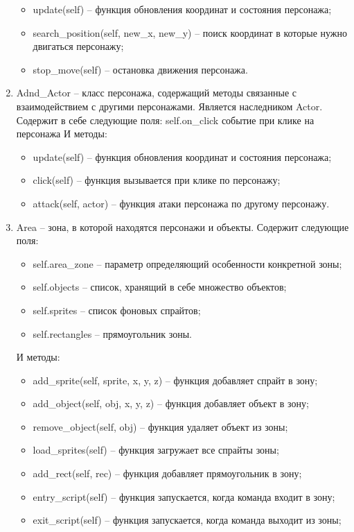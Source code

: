 \begin{enumerate}
\begin{itemize}
			\item update(self) -- функция обновления координат и состояния персонажа;
			\item search\_position(self, new\_x, new\_y) -- поиск координат в которые нужно двигаться персонажу;
			\item stop\_move(self) -- остановка движения персонажа.
		\end{itemize}
	\item Adnd\_Actor -- класс персонажа, содержащий методы связанные с взаимодействием с другими персонажами. Является наследником Actor. Содержит в себе следующие поля:
		self.on\_click событие при клике на персонажа
		И методы:
		\begin{itemize}
			\item update(self) -- функция обновления координат и состояния персонажа;
			\item click(self) -- функция вызывается при клике по персонажу;
			\item attack(self, actor) --  функция атаки персонажа по другому персонажу.
		\end{itemize}
	\item Area -- зона, в которой находятся персонажи и объекты. Содержит следующие поля:
		\begin{itemize}
			\item self.area\_zone -- параметр определяющий особенности конкретной зоны;
			\item self.objects -- список, хранящий в себе множество объектов;
			\item self.sprites -- список фоновых спрайтов;
			\item self.rectangles -- прямоугольник зоны.
		\end{itemize}
		И методы:
		\begin{itemize}
			\item add\_sprite(self, sprite, x, y, z) -- функция добавляет спрайт в зону;
			\item add\_object(self, obj, x, y, z) -- функция добавляет объект в зону;
			\item remove\_object(self, obj) -- функция удаляет объект из зоны;
			\item load\_sprites(self) -- функция загружает все спрайты зоны;
			\item add\_rect(self, rec) -- функция добавляет прямоугольник в зону;
			\item entry\_script(self) -- функция запускается, когда команда входит в зону;
			\item exit\_script(self) -- функция запускается, когда команда выходит из зоны;

\end{itemize}
\end{enumerate}
